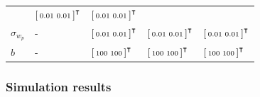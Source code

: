 \begin{table}[ht]
\begin{center}
\begin{tabular}{p{}>{\centering\arraybackslash}p{}>{\centering\arraybackslash}p{}>{\centering\arraybackslash}p{}>{\centering\arraybackslash}p{}}
			& $\begin{bsmallmatrix}0.01 & 0.01\end{bsmallmatrix}^\intercal$ 
			& $\begin{bsmallmatrix}0.01 & 0.01\end{bsmallmatrix}^\intercal$ \\
			$\sigma_{w_p}$ & - & $\begin{bsmallmatrix}0.01 & 0.01\end{bsmallmatrix}^\intercal$
			& $\begin{bsmallmatrix}0.01 & 0.01\end{bsmallmatrix}^\intercal$ 
			& $\begin{bsmallmatrix}0.01 & 0.01\end{bsmallmatrix}^\intercal$ \\
			$b$ & - & $\begin{bsmallmatrix}100 & 100\end{bsmallmatrix}^\intercal$
			& $\begin{bsmallmatrix}100 & 100\end{bsmallmatrix}^\intercal$ 
			& $\begin{bsmallmatrix}100 & 100\end{bsmallmatrix}^\intercal$ \\
			\hline
		\end{tabular}
	\end{center}
\end{table}

\subsubsection{Simulation results} \label{sec:sim-obs-lin-2-results}

